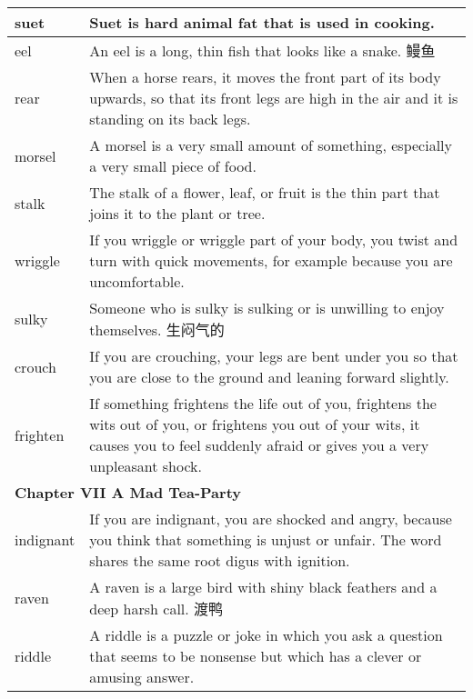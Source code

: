 \documentclass{ctexart}
\begin{document}
\begin{center}
\begin{longtable}{|l|p{7.8cm}|}
\hline
suet
&
Suet is hard animal fat that is used in cooking.
\\


\hline
eel
&
An eel is a long, thin fish that looks like a snake. 鳗鱼
\\

\hline
rear
&
When a horse rears, it moves the front part of its body upwards, so that its front legs are high in the air and it is standing on its back legs.
\\

\hline
morsel
&
A morsel is a very small amount of something, especially a very small piece of food.
\\

\hline
stalk
&
The stalk of a flower, leaf, or fruit is the thin part that joins it to the plant or tree.
\\

\hline
wriggle
&
If you wriggle or wriggle part of your body, you twist and turn with quick movements, for example because you are uncomfortable.
\\

\hline
sulky
&
Someone who is sulky is sulking or is unwilling to enjoy themselves. 生闷气的
\\

\hline
crouch
&
If you are crouching, your legs are bent under you so that you are close to the ground and leaning forward slightly.
\\

\hline
frighten
&
If something frightens the life out of you, frightens the wits out of you, or frightens you out of your wits, it causes you to feel suddenly afraid or gives you a very unpleasant shock.
\\

\hline
\multicolumn{2}{|l|}{\textbf{Chapter VII A Mad Tea-Party}}\\

\hline
indignant
&
If you are indignant, you are shocked and angry, because you think that something is unjust or unfair. The word shares the same root digus with ignition.
\\

\hline
raven
&
A raven is a large bird with shiny black feathers and a deep harsh call. 渡鸭
\\

\hline
riddle
&
A riddle is a puzzle or joke in which you ask a question that seems to be nonsense but which has a clever or amusing answer.
\\


\end{longtable}
\end{center}
\end{document}
